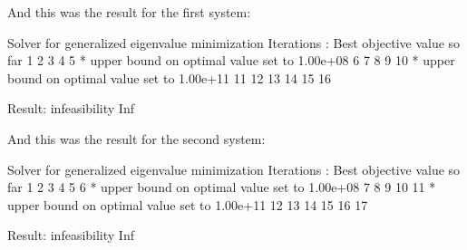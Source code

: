 \documentclass[12pt, letterpaper]{article}
\begin{document}
And this was the result for the first system:

Solver for generalized eigenvalue minimization 
 Iterations   :    Best objective value so far 
      1
     2
     3
     4
     5
* upper bound on optimal value set to  1.00e+08
     6
     7
     8
     9
    10
* upper bound on optimal value set to  1.00e+11
    11
    12
    13
    14
    15
    16

 Result:  infeasibility
   Inf

And this was the result for the second system:

Solver for generalized eigenvalue minimization 
Iterations   :    Best objective value so far 
     1
    2
    3
    4
    5
    6
* upper bound on optimal value set to  1.00e+08
    7
    8
    9
   10
   11
* upper bound on optimal value set to  1.00e+11
   12
   13
   14
   15
   16
   17

Result:  infeasibility
  Inf
\end{document}
